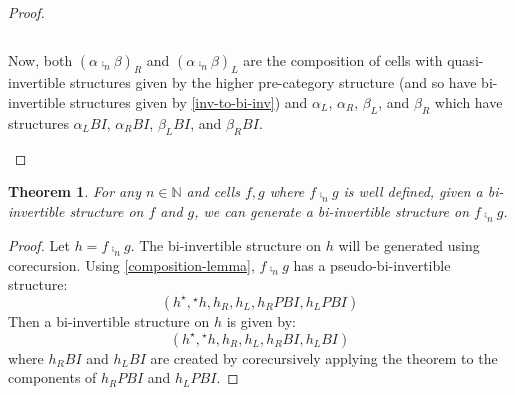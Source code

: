 \documentclass[draft]{article}
\newtheorem{theorem}{Theorem} \newtheorem{prop}{Proposition}
\theoremstyle{definition} \newtheorem{definition}{Definition}
\theoremstyle{remark} \newtheorem{remark}{Remark}
\newcommand{\linv}[1]{{}^\star\!#1} \newcommand{\rinv}[1]{#1^\star}
\begin{document}
\begin{proof}
\begin{itemize}
\begin{itemize}
\begin{equation*}
      \end{equation*}
    \end{itemize}
    Now, both \({(\alpha \comp_n \beta)}_R\) and \({(\alpha \comp_n
      \beta)}_L\) are the composition of cells with quasi-invertible
    structures given by the higher pre-category structure (and so have
    bi-invertible structures given by \cref{inv-to-bi-inv}) and
    \(\alpha_L\), \(\alpha_R\), \(\beta_L\), and \(\beta_R\) which
    have structures \(\alpha_L{}BI\), \(\alpha_R{}BI\),
    \(\beta_L{}BI\), and \(\beta_R{}BI\).
  \end{itemize}
\end{proof}

\begin{theorem}\label{bi-inv-composition}
  For any \(n \in \mathbb{N}\) and cells \(f,g\) where \(f \comp_n g\)
  is well defined, given a bi-invertible structure on \(f\) and \(g\),
  we can generate a bi-invertible structure on \(f \comp_n g\).
\end{theorem}
\begin{proof}
  Let \(h = f \comp_n g\). The bi-invertible structure on \(h\) will
  be generated using corecursion. Using \cref{composition-lemma}, \(f
  \comp_n g\) has a pseudo-bi-invertible structure:
  \begin{equation*}
    (\rinv h, \linv h, h_R, h_L, h_R{}PBI, h_L{}PBI)
  \end{equation*}
  Then a bi-invertible structure on \(h\) is given by:
  \begin{equation*}
    (\rinv h, \linv h, h_R, h_L, h_R{}BI, h_L{}BI)
  \end{equation*}
  where \(h_R{}BI\) and \(h_L{}BI\) are created by corecursively
  applying the theorem to the components of \(h_R{}PBI\) and
  \(h_L{}PBI\).
\end{proof}
\end{document}
